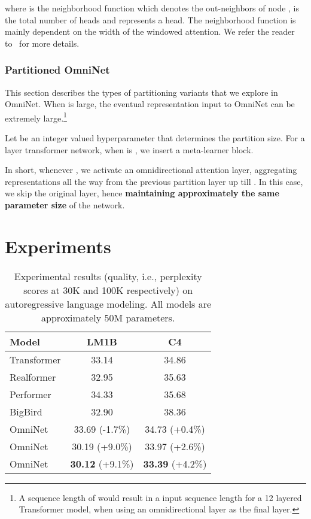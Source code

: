 \documentclass{article}
\begin{document}
where  is the neighborhood function which denotes the out-neighbors of node ,  is the total number of heads and  represents a head. The neighborhood function is mainly dependent on the width of the windowed attention. We refer the reader to~\citep{zaheer2020big} for more details.

\subsubsection{Partitioned OmniNet}
This section describes the types of partitioning variants that we explore in OmniNet. When  is large, the eventual representation input to OmniNet can be extremely large.\footnote{A sequence length of  would result in a  input sequence length for a 12 layered Transformer model, when using an omnidirectional layer as the final layer.}

Let  be an integer valued hyperparameter that determines the partition size. For a  layer transformer network, when  is , we insert a meta-learner block. 

In short, whenever , we activate an omnidirectional attention layer, aggregating representations all the way from the previous partition  layer up till . In this case, we skip the original  layer, hence \textbf{maintaining approximately the same parameter size} of the network.
\section{Experiments}
\begin{table}[t]
    \vspace{-5pt}
    \centering
    \caption{Experimental results (quality, i.e., perplexity scores at 30K and 100K respectively) on autoregressive language modeling. All models are approximately 50M parameters.}
    \begin{tabular}{l|cc}
    \toprule 
      Model   & LM1B & C4 
      \\
      \midrule
      Transformer   & 33.14  & 34.86 \\
      Realformer &32.95 & 35.63 \\
      Performer & 34.33 & 35.68\\ 
      BigBird & 32.90 &  38.36\\ 
      \midrule
      OmniNet &33.69 (-1.7\%)  & 34.73 (+0.4\%) \\
      OmniNet & 30.19 (+9.0\%) & 33.97 (+2.6\%) \\
      OmniNet &\textbf{30.12} (+9.1\%) & \textbf{33.39} (+4.2\%)\\
      \bottomrule
    \end{tabular}
    \label{tab:lmexp}
    \vspace{-18pt}
\end{table}
\end{document}
